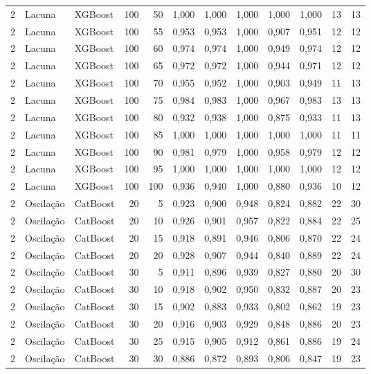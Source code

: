 \begin{longtable}{@{}rllrrrrrrrrr@{}}
2 & Lacuna & XGBoost & 100 & 50 & 1,000 & 1,000 & 1,000 & 1,000 & 1,000 & 13 & 13 \\
2 & Lacuna & XGBoost & 100 & 55 & 0,953 & 0,953 & 1,000 & 0,907 & 0,951 & 12 & 12 \\
2 & Lacuna & XGBoost & 100 & 60 & 0,974 & 0,974 & 1,000 & 0,949 & 0,974 & 12 & 12 \\
2 & Lacuna & XGBoost & 100 & 65 & 0,972 & 0,972 & 1,000 & 0,944 & 0,971 & 12 & 12 \\
2 & Lacuna & XGBoost & 100 & 70 & 0,955 & 0,952 & 1,000 & 0,903 & 0,949 & 11 & 13 \\
2 & Lacuna & XGBoost & 100 & 75 & 0,984 & 0,983 & 1,000 & 0,967 & 0,983 & 13 & 13 \\
2 & Lacuna & XGBoost & 100 & 80 & 0,932 & 0,938 & 1,000 & 0,875 & 0,933 & 11 & 13 \\
2 & Lacuna & XGBoost & 100 & 85 & 1,000 & 1,000 & 1,000 & 1,000 & 1,000 & 11 & 11 \\
2 & Lacuna & XGBoost & 100 & 90 & 0,981 & 0,979 & 1,000 & 0,958 & 0,979 & 12 & 12 \\
2 & Lacuna & XGBoost & 100 & 95 & 1,000 & 1,000 & 1,000 & 1,000 & 1,000 & 12 & 12 \\
2 & Lacuna & XGBoost & 100 & 100 & 0,936 & 0,940 & 1,000 & 0,880 & 0,936 & 10 & 12 \\
2 & Oscilação & CatBoost & 20 & 5 & 0,923 & 0,900 & 0,948 & 0,824 & 0,882 & 22 & 30 \\
2 & Oscilação & CatBoost & 20 & 10 & 0,926 & 0,901 & 0,957 & 0,822 & 0,884 & 22 & 25 \\
2 & Oscilação & CatBoost & 20 & 15 & 0,918 & 0,891 & 0,946 & 0,806 & 0,870 & 22 & 24 \\
2 & Oscilação & CatBoost & 20 & 20 & 0,928 & 0,907 & 0,944 & 0,840 & 0,889 & 22 & 24 \\
2 & Oscilação & CatBoost & 30 & 5 & 0,911 & 0,896 & 0,939 & 0,827 & 0,880 & 20 & 30 \\
2 & Oscilação & CatBoost & 30 & 10 & 0,918 & 0,902 & 0,950 & 0,832 & 0,887 & 20 & 23 \\
2 & Oscilação & CatBoost & 30 & 15 & 0,902 & 0,883 & 0,933 & 0,802 & 0,862 & 19 & 23 \\
2 & Oscilação & CatBoost & 30 & 20 & 0,916 & 0,903 & 0,929 & 0,848 & 0,886 & 20 & 23 \\
2 & Oscilação & CatBoost & 30 & 25 & 0,915 & 0,905 & 0,912 & 0,861 & 0,886 & 19 & 24 \\
2 & Oscilação & CatBoost & 30 & 30 & 0,886 & 0,872 & 0,893 & 0,806 & 0,847 & 19 & 23 \\

\end{longtable}
